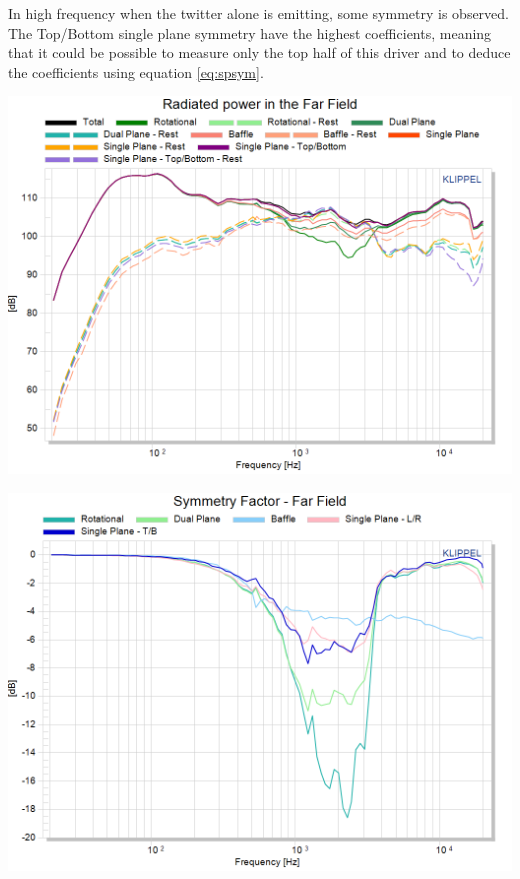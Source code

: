 \documentclass{report}
\begin{document}
In high frequency when the twitter alone is emitting, some symmetry is observed. The Top/Bottom single plane symmetry have the highest coefficients, meaning that it could be possible to measure only the top half of this driver and to deduce the coefficients using equation \ref{eq:spsym}.\\

\begin{minipage}{0.5\textwidth}
\begin{center}
	\includegraphics[width=.9\textwidth]{Sym/Rad_Pow_BnO} 
    \captionsetup{hypcap=false} 
	\label{fig:rad_pow_BnO}
\end{center}
\end{minipage}
\begin{minipage}{0.5\textwidth}
\begin{center}
	\includegraphics[width=.9\textwidth]{Sym/Sym_Fact_BnO} 
    \captionsetup{hypcap=false} 
	\label{fig:sym_fact_BnO}
\end{center}
\end{minipage}
\vspace{0.1cm}
\end{document}
